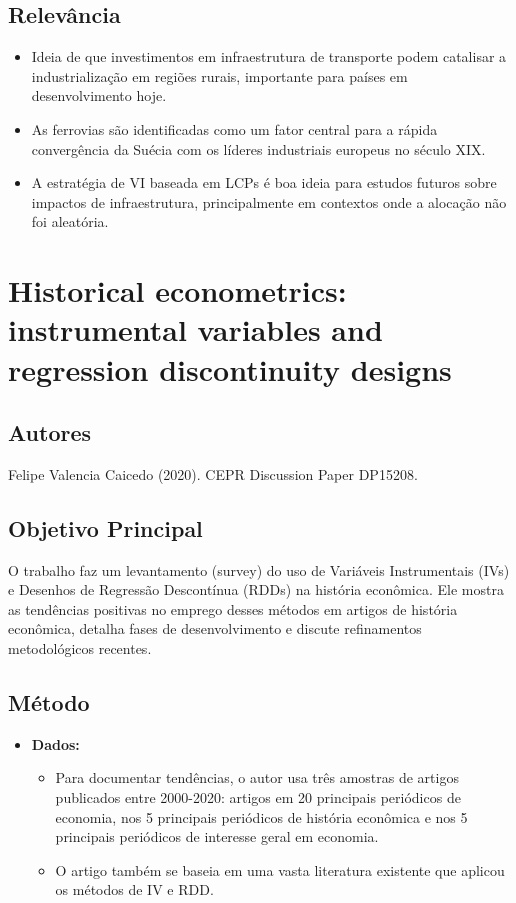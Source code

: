 \documentclass[12pt]{article}
\begin{document}
\subsection*{Relevância}
\begin{itemize}[leftmargin=*]
    \item Ideia de que investimentos em infraestrutura de transporte podem catalisar a industrialização em regiões rurais, importante para países em desenvolvimento hoje.
    \item As ferrovias são identificadas como um fator central para a rápida convergência da Suécia com os líderes industriais europeus no século XIX.
    \item A estratégia de VI baseada em LCPs é boa ideia para estudos futuros sobre impactos de infraestrutura, principalmente em contextos onde a alocação não foi aleatória.
\end{itemize}

\newpage
\section{Historical econometrics: instrumental variables and regression discontinuity designs}

\subsection*{Autores}
Felipe Valencia Caicedo (2020). CEPR Discussion Paper DP15208.

\subsection*{Objetivo Principal}
O trabalho faz um levantamento (survey) do uso de Variáveis Instrumentais (IVs) e Desenhos de Regressão Descontínua (RDDs) na história econômica. Ele mostra as tendências positivas no emprego desses métodos em artigos de história econômica, detalha fases de desenvolvimento e discute refinamentos metodológicos recentes.

\subsection*{Método}
\begin{itemize}[leftmargin=*]
    \item \textbf{Dados:}
    \begin{itemize}
       \item Para documentar tendências, o autor usa três amostras de artigos publicados entre 2000-2020: artigos em 20 principais periódicos de economia, nos 5 principais periódicos de história econômica e nos 5 principais periódicos de interesse geral em economia.
       \item O artigo também se baseia em uma vasta literatura existente que aplicou os métodos de IV e RDD.
    \end{itemize}
\end{itemize}
\end{document}
